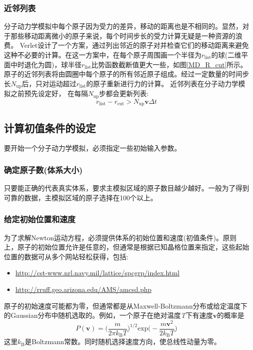 \subsubsection{近邻列表}
分子动力学模拟中每个原子因为受力的差异，移动的距离也是不相同的。显然，对于那些移动距离微小的原子来说，每个时间步长的受力计算无疑是一种资源的浪费。%
\textrm{Verlet}\cite{PR159-98_1967}设计了一个方案，通过列出邻近的原子对并检查它们的移动距离来避免这种不必要的计算。在这一方案中，在每个原子周围画一个半径为$r_{\mathrm{list}}$的球(二维平面中时退化为圆)，球半径$r_{\mathrm{list}}$比势函数截断值更大一些，如图\ref{MD_R_cut}所示。%
原子的近邻列表将由圆圈中每个原子的所有邻近原子组成。经过一定数量的时间步长$N_{\mathrm{up}}$后，只对运动超过$r_{\mathrm{list}}$的原子重新进行力的计算。
近邻列表在分子动力学模拟之前预先设定好，%
在每隔$N_{\mathrm{up}}$步都会更新列表:
\begin{equation}
	r_{\mathrm{list}}-r_{\mathrm{cut}}>N_{\mathrm{up}}\mathbf{v}\Delta t
	\label{eq:r_list_circle}
\end{equation}

\subsection{计算初值条件的设定}
要开始一个分子动力学模拟，必须指定一些初始输入参数。%
\subsubsection{确定原子数(体系大小)}
只要能正确的代表真实体系，要求主模拟区域的原子数目越少越好。一般为了得到可靠的数据，主模拟区域的原子选择在100个以上。
\subsubsection{给定初始位置和速度}
为了求解\textrm{Newton}运动方程，必须提供体系的初始位置和速度(初值条件)。原则上，原子的初始位置允许是任意的，但通常是根据已知晶格位置来指定，这些起始位置的数据可从多个网站轻松获得，包括:
\begin{itemize}
	\item \url{http://cst-www.nrl.navy.mil/lattice/spcgrp/index.html}
	\item \url{http://rruff.geo.arizona.edu/AMS/amcsd.php}
\end{itemize}
原子的初始速度可能都为零，但通常都是从\textrm{Maxwell-Boltzmann}分布或给定温度下的\textrm{Gaussian}分布中随机选取的。例如，一个原子在绝对温度\textit{T}下有速度$\mathbf{v}$的概率是
\begin{equation}
	P(\mathbf{v})=\bigg(\dfrac{m}{2\pi k_{\mathrm{B}}T}\bigg)^{1/2}\mathrm{exp}\bigg(-\dfrac{m\mathbf{v}^2}{2k_{\mathrm{B}}T}\bigg)
	\label{eq:v-MB}
\end{equation}
这里$k_{\mathrm{B}}$是\textrm{Boltzmann}常数。同时随机选择速度方向，使总线性动量为零。
